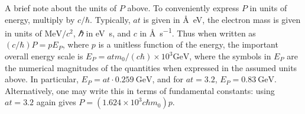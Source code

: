 A brief note about the units of $P$ above.
To conveniently express $P$ in units of energy,
multiply by $c / \si{\planckbar}$.
Typically, $a t$ is given in \si{\angstrom\electronvolt},
the electron mass is given in units
of $\si{\mega \electronvolt} / c^2$,
\si{\planckbar} in \si{\electronvolt\second},
and $c$ in \si{\angstrom\per\second}.
Thus when written as $(c / ℏ) P = p E_P$,
where $p$ is a unitless function of the energy,
the important overall energy scale is
$E_P = at m_0 / (c ℏ) × 10^3 \si{\giga\electronvolt}$,
where the symbols in $E_P$ are the numerical magnitudes of the
quantities when expressed in the assumed units above.
In particular,
$E_P = at · \SI{0.259}{\giga\electronvolt}$,
and for $at = 3.2$, $E_P = \SI{0.83}{\giga\electronvolt}$.
Alternatively, one may write this in terms of fundamental constants:
using $at = 3.2$ again gives
$P = \left( 1.624 × 10^3 c ℏ m_0 \right) p$.

